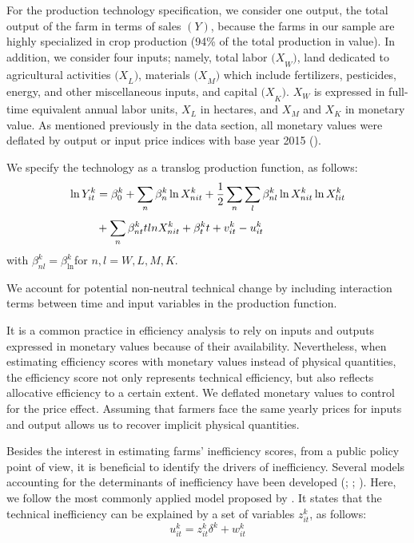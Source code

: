 \begin{Article}
\begin{refsection}[Lassalas]
For the production technology specification, we consider one output, the
total output of the farm in terms of sales \((Y)\), because the farms in
our sample are highly specialized in crop production (94\% of the total
production in value). In addition, we consider four inputs; namely,
total labor \({(X}_{W})\), land dedicated to agricultural activities
\({(X}_{L})\), materials \({(X}_{M})\) which include fertilizers,
pesticides, energy, and other miscellaneous inputs, and capital
\({(X}_{K})\). \(X_{W}\) is expressed in full-time equivalent annual
labor units, \(X_{L}\) in hectares, and \(X_{M}\) and \(X_{K}\) in
monetary value. As mentioned previously in the data section, all
monetary values were deflated by output or input price indices with base
year 2015 (\textcite{insee_2022}). 

We specify the technology as a translog
production function, as follows:
\begin{align}
\ln Y_{it}^{k} &= \beta_{0}^{k} + \sum_{n}^{}{\beta_{n}^{k}\ln X_{nit}^{k}} + \frac{1}{2}\sum_{n}^{}{\sum_{l}^{}{\beta_{nl}^{k}\ln X_{nit}^{k}\ln X_{lit}^{k}}} \notag \\
               & + \sum_{n}^{}{\beta_{nt}^{k}tlnX_{nit}^{k}} + \beta_{t}^{k}t + v_{it}^{k} - u_{it}^{k}
\end{align}
with \(\beta_{nl}^{k} = \beta_{\ln}^{k}\)for
\(n,l = W,L,M,K\).

We account for potential non-neutral technical change by including
interaction terms between time and input variables in the production
function.

It is a common practice in efficiency analysis to rely on inputs and
outputs expressed in monetary values because of their availability.
Nevertheless, when estimating efficiency scores with monetary values
instead of physical quantities, the efficiency score not only represents
technical efficiency, but also reflects allocative efficiency to a
certain extent. We deflated monetary values to control for the price
effect. Assuming that farmers face the same yearly prices for inputs and
output allows us to recover implicit physical quantities.

Besides the interest in estimating farms' inefficiency scores, from a
public policy point of view, it is beneficial to identify the drivers of
inefficiency. Several models accounting for the determinants of
inefficiency have been developed (\textcite{kumbhakar_ghosh_mcguckin_1991};
\textcite{reifschneider_stevenson_1991}; \textcite{huang_liu_1994}). Here,
we follow the most commonly applied model proposed by \textcite{battese1995model}. It states that the technical inefficiency can be explained
by a set of variables \(z_{it}^{k}\), as follows:
\begin{equation}
u_{it}^{k} = z_{it}^{k}\delta^{k} + w_{it}^{k}    
\end{equation}


\end{refsection}
\end{Article}
